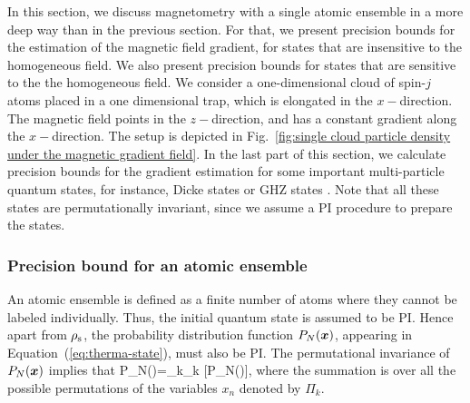 In this section, we discuss magnetometry with a single
atomic ensemble in a more deep way than in the previous section.
For that, we present precision bounds for
the estimation of the magnetic field gradient, for
states that are insensitive to the homogeneous field.
We also present precision bounds for states that are sensitive to the
the homogeneous field.
We consider a one-dimensional cloud of spin-$j$ atoms
placed in a one dimensional trap, which is elongated
in the  $x-$direction.
The magnetic field points in the  $z-$direction,
and has a constant gradient along the $x-$direction.
The setup is depicted
in Fig.~\ref{fig:single cloud particle density under the magnetic gradient field}.
In the last part of this section, we calculate precision bounds for the
gradient estimation for some important multi-particle quantum states,
for instance, Dicke states \cite{} or
GHZ states \cite{Greenberger1990}.
Note that all these states are permutationally invariant, since we
assume a PI procedure to prepare the states.

\subsubsection{Precision bound for an atomic ensemble}

An atomic ensemble is defined as a finite number of atoms where
they cannot be labeled individually.
Thus, the initial quantum state is assumed to be PI.
Hence apart from $\rho_{\rm s}$, the probability distribution function
$P_N(\boldsymbol{x})$, appearing in Equation~(\ref{eq:therma-state}),
must also be PI.
The permutational invariance of $P_N(\boldsymbol{x})$ implies that
\be
\label{eq:pi-for-pdf}
P_N()=\sum_{k}\Pi_k [P_N()],
\ee
where the summation is over all the possible permutations
of the variables $x_n$ denoted by
$\Pi_k.$

